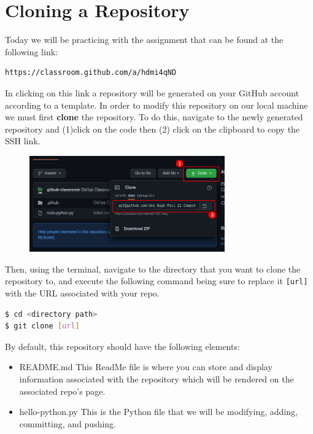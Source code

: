 \documentclass[a4paper,10pt]{article} %
\begin{document}
\section{Cloning a Repository}

Today we will be practicing with the assignment that can be found at the following link: \\
\begin{lstlisting}
https://classroom.github.com/a/hdmi4qND
\end{lstlisting}
In clicking on this link a repository will be generated on your GitHub account according to a template. In order to modify this repository on our local machine we must first \textbf{clone} the repository. To do this, navigate to the newly generated repository and  (1)click on the code then (2) click on the clipboard to copy the SSH link.
\begin{figure}[H]
  \centering
  \includegraphics[width=0.75\textwidth]{./imgs/cloning.png}
\end{figure}
Then, using the terminal, navigate to the directory that you want to clone the repository to, and execute the following command being sure to replace it \lstinline|[url]| with the URL associated with your repo.

\begin{lstlisting}[language=bash]
$ cd <directory path>
$ git clone [url]
\end{lstlisting}

By default, this repository should have the following elements:
\begin{itemize}
  \item README.md \textrightarrow This ReadMe file is where you can store and display information associated with the repository which will be rendered on the associated repo's page.
  \item hello-python.py \textrightarrow This is the Python file that we will be modifying, adding, committing, and pushing.
\end{itemize}
\end{document}
